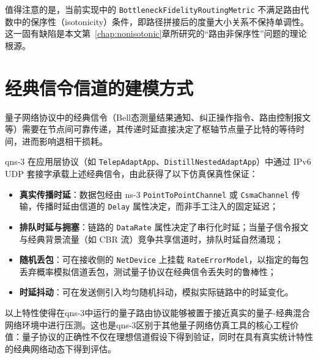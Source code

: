 值得注意的是，当前实现中的 \texttt{BottleneckFidelityRoutingMetric} 不满足路由代数中的保序性（isotonicity）条件\cite{Wang2025}，即路径拼接后的度量大小关系不保持单调性。这一固有缺陷是本文第~\ref{chap:nonisotonic}章所研究的“路由非保序性”问题的理论根源。

\section{经典信令信道的建模方式}
\label{sec:signaling}

量子网络协议中的经典信令（Bell态测量结果通知、纠正操作指令、路由控制报文等）需要在节点间可靠传递，其传递时延直接决定了枢轴节点量子比特的等待时间，进而影响退相干损耗。

qns-3 在应用层协议（如 \texttt{TelepAdaptApp}、\texttt{DistillNestedAdaptApp}）中通过 IPv6 UDP 套接字承载上述经典信令，由此获得了以下仿真保真性保证：
\begin{itemize}
  \item \textbf{真实传播时延}：数据包经由 ns-3 \texttt{PointToPointChannel} 或 \texttt{CsmaChannel} 传输，传播时延由信道的 \texttt{Delay} 属性决定，而非手工注入的固定延迟；
  \item \textbf{排队时延与拥塞}：链路的 \texttt{DataRate} 属性决定了串行化时延；当量子信令报文与经典背景流量（如 CBR 流）竞争共享信道时，排队时延自然涌现；
  \item \textbf{随机丢包}：可在接收侧的 \texttt{NetDevice} 上挂载 \texttt{RateErrorModel}，以指定的每包丢弃概率模拟信道丢包，测试量子协议在经典信令丢失时的鲁棒性；
  \item \textbf{时延抖动}：可在发送侧引入均匀随机抖动，模拟实际链路中的时延变化。
\end{itemize}

以上特性使得在qns-3中运行的量子路由协议能够被置于接近真实的量子-经典混合网络环境中进行压测。这也是qns-3区别于其他量子网络仿真工具的核心工程价值：量子协议的正确性不仅在理想信道假设下得到验证，同时在具有真实统计特性的经典网络动态下得到评估。

